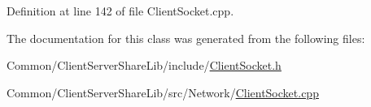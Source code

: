 Definition at line 142 of file Client\+Socket.\+cpp.



The documentation for this class was generated from the following files\+:\begin{DoxyCompactItemize}
\item 
Common/\+Client\+Server\+Share\+Lib/include/\hyperlink{_client_socket_8h}{Client\+Socket.\+h}\item 
Common/\+Client\+Server\+Share\+Lib/src/\+Network/\hyperlink{_client_socket_8cpp}{Client\+Socket.\+cpp}\end{DoxyCompactItemize}
